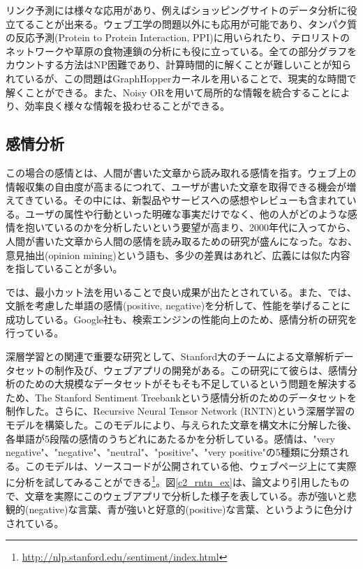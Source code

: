 リンク予測には様々な応用があり、例えばショッピングサイトのデータ分析に役立てることが出来る\cite{clauset2004finding}。ウェブ工学の問題以外にも応用が可能であり、タンパク質の反応予測(Protein to Protein Interaction, PPI)に用いられたり\cite{bader2003gaining}、テロリストのネットワークや草原の食物連鎖の分析にも役に立っている\cite{clauset2008hierarchical}。全ての部分グラフをカウントする方法はNP困難であり、計算時間的に解くことが難しいことが知られている\cite{gartner2003graph}が、この問題はGraphHopperカーネルを用いることで、現実的な時間で解くことができる\cite{feragen2013scalable}。また、Noisy ORを用いて局所的な情報を統合することにより、効率良く様々な情報を扱わせることができる\cite{changpinyo2013similarity}。

\subsection{感情分析}
この場合の感情とは、人間が書いた文章から読み取れる感情を指す。ウェブ上の情報収集の自由度が高まるにつれて、ユーザが書いた文章を取得できる機会が増えてきている。その中には、新製品やサービスへの感想やレビューも含まれている。ユーザの属性や行動といった明確な事実だけでなく、他の人がどのような感情を抱いているのかを分析したいという要望が高まり、2000年代に入ってから、人間が書いた文章から人間の感情を読み取るための研究が盛んになった\cite{pang2008opinion}。なお、意見抽出(opinion mining)という語も、多少の差異はあれど、広義には似た内容を指していることが多い。\par
\cite{pang2004sentimental}では、最小カット法を用いることで良い成果が出たとされている。また、\cite{wilson2005recognizing}では、文脈を考慮した単語の感情(positive, negative)を分析して、性能を挙げることに成功している。Google社も、検索エンジンの性能向上のため、感情分析の研究を行っている\cite{godbole2007large}。\par
深層学習との関連で重要な研究として、Stanford大のチームによる文章解析データセットの制作及び、ウェブアプリの開発がある\cite{socher2013recursive}。この研究にて彼らは、感情分析のための大規模なデータセットがそもそも不足しているという問題を解決するため、The Stanford Sentiment Treebankという感情分析のためのデータセットを制作した。さらに、Recursive Neural Tensor Network (RNTN)という深層学習のモデルを構築した。このモデルにより、与えられた文章を構文木に分解した後、各単語が5段階の感情のうちどれにあたるかを分析している。感情は、"very negative"、"negative"、"neutral"、"positive"、"very positive"の5種類に分類される。このモデルは、ソースコードが公開されている他、ウェブページ上にて実際に分析を試してみることができる\footnote{\url{http://nlp.stanford.edu/sentiment/index.html}}。図\ref{c2_rntn_ex}は、論文より引用したもので、文章を実際にこのウェブアプリで分析した様子を表している。赤が強いと悲観的(negative)な言葉、青が強いと好意的(positive)な言葉、というように色分けされている。
